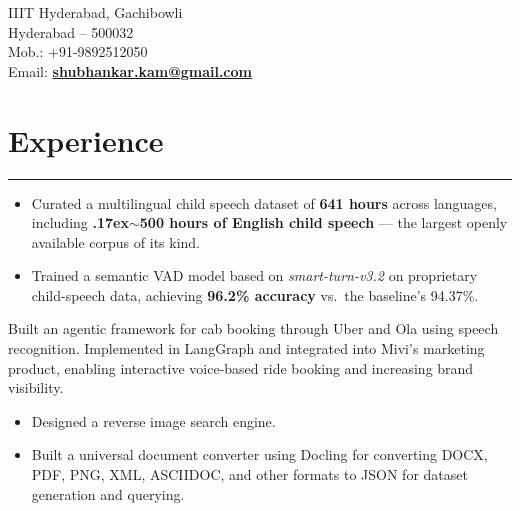 \documentclass[]{rahulworld-resume}
\begin{document}
\begin{minipage}[t]{0.64\textwidth}
\hspace*{0pt}\hfill IIIT Hyderabad, Gachibowli \\
\hspace*{0pt}\hfill Hyderabad – 500032 \\
\hspace*{0pt}\hfill Mob.: +91-9892512050 \\
\hspace*{0pt}\hfill Email: \textbf{\href{mailto:shubhankar.kam@gmail.com}{shubhankar.kam@gmail.com}} \\

\section{Experience}
\noindent\rule{12.5cm}{0.4pt}

 
\noindent
\hspace{5em}%
\begin{minipage}{0.85\textwidth\vspace{5pt}}
\begin{itemize}
    \item Curated a multilingual child speech dataset of \textbf{641 hours} across languages, including \textbf{{\raise.17ex\hbox{$\scriptstyle\sim$}}500 hours of English child speech} — the largest openly available corpus of its kind.
    \item Trained a semantic VAD model based on \textit{smart-turn-v3.2} on proprietary child-speech data, achieving \textbf{96.2\% accuracy} vs.\ the baseline's 94.37\%.
\end{itemize}
\end{minipage}

 
\noindent
\hspace{5em}%
\begin{minipage}{0.85\textwidth\vspace{5pt}}
Built an agentic framework for cab booking through Uber and Ola using speech recognition. Implemented in LangGraph and integrated into Mivi's marketing product, enabling interactive voice-based ride booking and increasing brand visibility.
\end{minipage}

 
\noindent
\hspace{5em}%
\begin{minipage}{0.85\textwidth\vspace{5pt}}
\begin{itemize}
    \item Designed a reverse image search engine.
    \item Built a universal document converter using Docling for converting DOCX, PDF, PNG, XML, ASCIIDOC, and other formats to JSON for dataset generation and querying.
\end{itemize}
\end{minipage}


\end{minipage}
\end{document}
